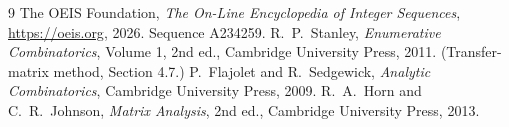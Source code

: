 \documentclass[11pt,a4paper]{article}
\theoremstyle{plain}
\theoremstyle{definition}
\begin{document}
\begin{thebibliography}{9}
 The OEIS Foundation, \emph{The On-Line Encyclopedia of Integer
Sequences}, \url{https://oeis.org}, 2026. Sequence A234259.
 R.~P.~Stanley, \emph{Enumerative Combinatorics}, Volume 1, 2nd ed.,
Cambridge University Press, 2011. (Transfer-matrix method, Section 4.7.)
 P.~Flajolet and R.~Sedgewick, \emph{Analytic Combinatorics}, Cambridge
University Press, 2009.
 R.~A.~Horn and C.~R.~Johnson, \emph{Matrix Analysis}, 2nd ed., Cambridge
University Press, 2013.
\end{thebibliography}
\end{document}
